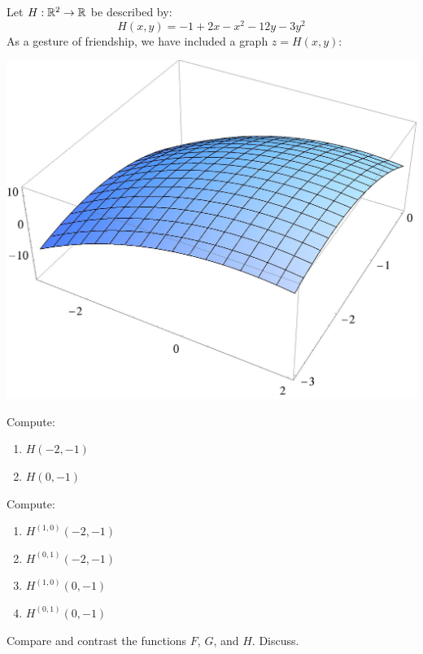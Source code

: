 \documentclass[handout,noauthor,nooutcomes]{ximera}
\begin{document}
Let  $H:\mathbb R^2\to\mathbb R$ be described by:
\[
H(x,y) = -1 + 2 x - x^2 - 12 y - 3 y^2
\]
As a gesture of friendship, we have included a graph $z = H(x,y)$:
\begin{image}
  \includegraphics{surfacePlot.jpg}
\end{image}

\begin{problem}
  Compute:
    \begin{enumerate}
    \item $H(-2,-1)$
    \item $H(0,-1)$
    \end{enumerate}
\end{problem}

\begin{problem}
  Compute:
    \begin{enumerate}
    \item $H^{(1,0)}(-2,-1)$
    \item $H^{(0,1)}(-2,-1)$
    \item $H^{(1,0)}(0,-1)$
    \item $H^{(0,1)}(0,-1)$
    \end{enumerate}
\end{problem}

\begin{problem}
  Compare and contrast the functions $F$, $G$, and $H$. Discuss.
\end{problem}
\end{document}
